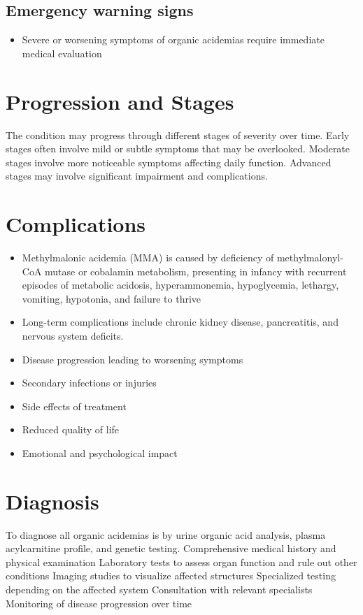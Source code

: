 \subsection{Emergency warning signs}
\begin{itemize}[noitemsep]
  \item Severe or worsening symptoms of organic acidemias require immediate medical evaluation
\end{itemize}
\section{Progression and Stages}
The condition may progress through different stages of severity over time. Early stages often involve mild or subtle symptoms that may be overlooked. Moderate stages involve more noticeable symptoms affecting daily function. Advanced stages may involve significant impairment and complications.
\section{Complications}
\begin{itemize}[noitemsep]
  \item Methylmalonic acidemia (MMA) is caused by deficiency of methylmalonyl-CoA mutase or cobalamin metabolism, presenting in infancy with recurrent episodes of metabolic acidosis, hyperammonemia, hypoglycemia, lethargy, vomiting, hypotonia, and failure to thrive
  \item Long-term complications include chronic kidney disease, pancreatitis, and nervous system deficits.
  \item Disease progression leading to worsening symptoms
  \item Secondary infections or injuries
  \item Side effects of treatment
  \item Reduced quality of life
  \item Emotional and psychological impact
\end{itemize}
\section{Diagnosis}
To diagnose all organic acidemias is by urine organic acid analysis, plasma acylcarnitine profile, and genetic testing. Comprehensive medical history and physical examination Laboratory tests to assess organ function and rule out other conditions Imaging studies to visualize affected structures Specialized testing depending on the affected system Consultation with relevant specialists Monitoring of disease progression over time

